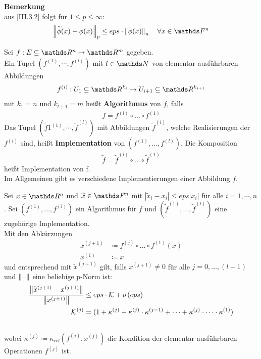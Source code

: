 \textbf{Bemerkung}\\
aus \eqref{III.3.2} folgt für $1\leq p\leq \infty$:
\begin{gather}
  \nn{\widetilde{\phi}(x)-\phi(x)}_p \leq eps\cdot\nn{\phi(x)}_n 
  \quad \forall x\in\F^n \label{III.3.3}
\end{gather}


\begin{Defe}
  Sei $f:E\subseteq \Ren \rightarrow \R^m$ gegeben.\\
  Ein Tupel $\left(f^{(1)},\cdots ,f^{(l)}\right)$ mit $l\in \N$ von elementar ausführbaren
  Abbildungen
  \begin{gather*}
    f^{(i)}: U_1\subseteq \R^{k_i} \rightarrow U_{i+1}\subseteq \R^{k_{i+1}}
  \end{gather*}
  mit $k_1=n$ und $k_{l+1}=m$ heißt \textbf{Algorithmus} von $f$, falls
  \begin{gather*}
    f=f	^{(l)}\circ \dotsc \circ f^{(1)}
  \end{gather*}
  Das Tupel $(\widetilde{f}1^{(1)},\cdots ,\widetilde{f}^{(l)})$ mit Abbildungen $\widetilde{f}^{(i)}$, welche Realisierungen der $f^{(i)}$ sind,
  heißt \textbf{Implementation} von 
  $\left(f^{(1)},\dotsc ,f^{(l)}\right)$.
  Die Komposition 
  \begin{gather*}
    \widetilde{f}=\widetilde{f}	^{(l)}\circ \dotsc \circ \widetilde{f}^{(1)}
  \end{gather*}
  heißt Implementation von f. \\
  Im Allgemeinen gibt es verschiedene Implementierungen einer Abbildung $f$.
\end{Defe}


\begin{Leme}[Fehlerfortpflanzung]
  \label{3.3.5} 
  Sei $x\in \Ren$ und $\widetilde{x}\in \F^n$ mit $|\widetilde{x}_i-x_i|\leq eps|x_i|$ für alle 
  $i=1,\cdots , n$.
  Sei $\left(f^{(1)},\dotsc ,f^{(l)}\right)$ ein Algorithmus für $f$ und 
  $(\widetilde{f}^{(1)},\dotsc ,\widetilde{f}^{(l)})$ eine zugehörige Implementation. \\
  Mit den Abkürzungen
  \begin{align*}
    x^{(j+1)} &\coloneqq f^{(j)}\circ \dotsc \circ f^{(1)}(x) \\
    x^{(1)} &\coloneqq x
  \end{align*}
  und entsprechend mit $\widetilde{x}^{(j+1)}$ gilt,
  falls $x^{(j+1)} \neq 0$ für alle $j=0,\dotsc , (l-1)$ und $\left\| \,\cdot\, \right\|$ eine beliebige p-Norm ist:
  \begin{align}
    \frac{\left\| \widetilde{x}^{(j+1)}-x^{(j+1)} \right\|}{\left\| x^{(j+1)} \right\|}
    &\leq eps \cdot \mathcal{K} + o\left(eps\right)
      \label{III.3.4} 
    \\ \nonumber
    \mathcal{K}^{(j)}&=(1+\kappa^{(j)}+\kappa^{(j)}\cdot \kappa^{(j-1)}+ \cdots + \kappa^{(j)}\cdot \dotsm \cdot \kappa^{(1)}) \\ \nonumber
  \end{align}
  wobei $	\kappa^{(j)} \coloneqq \kappa_{rel}(f^{(j)}, x^{(j)})$ die Kondition der elementar ausführbaren Operationen $f^{(j)}$ ist.
\end{Leme}

